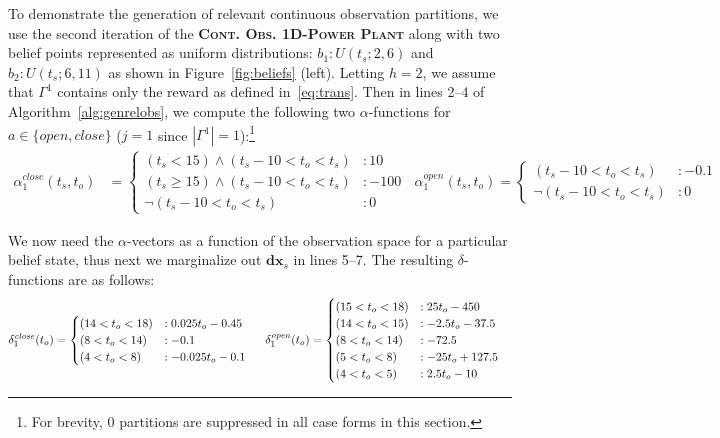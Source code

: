 \documentclass{article} %
\newcommand{\xds}{\mathbf{dx}_s}
\newcommand{\open}{\mathit{open}}
\newcommand{\close}{\mathit{close}}
\begin{document}
To demonstrate the generation of relevant continuous observation partitions, 
we use the second iteration of the \textsc{\bf Cont. Obs. 1D-Power
  Plant} along with two belief points represented as 
uniform distributions: $b_1: U(t_s;2,6)$ and $b_2: U(t_s;6,11)$ as
shown in Figure~\ref{fig:beliefs} (left).
Letting $h=2$, we assume that $\Gamma^{1}$ contains only the 
reward as defined in~\eqref{eq:trans}.
Then in lines 2--4 of Algorithm~\ref{alg:genrelobs}, we compute the 
following two $\alpha$-functions for $a \in \{ \open, \close \}$ 
($j=1$ since $|\Gamma^{1}| = 1$):\footnote{For brevity, 0 partitions
are suppressed in all case forms in this section.}
{\footnotesize
\vspace{-1mm}
\begin{align}
\alpha_1^{\close}(t_s,t_o) &= 
\begin{cases}
 (t_s<15)\wedge (t_s \! - \! 10 < t_o<t_s) &\!\!\!: 10 \\
(t_s\geq15)\wedge (t_s \! - \! 10 < t_o<t_s) &\!\!\!: -100  \\
\neg(t_s \! - \! 10 < t_o<t_s) &\!\!\! : 0
\end{cases}
\;\;
\alpha_1^{\open}(t_s,t_o) = \begin{cases}
(t_s \! - \! 10 < t_o<t_s) &\!\!\!: -0.1 \\
\neg(t_s \! - \! 10 < t_o<t_s) &\!\!\!: 0
\end{cases}
\nonumber
\end{align}
\vspace{-4mm}
} 

We now need the $\alpha$-vectors as a function of the observation
space for a particular belief state, thus next we marginalize out $\xds$
in lines 5--7. The resulting $\delta$-functions are as follows:
{\footnotesize
\vspace{-1mm}
\begin{align}
\delta^{\close}_1(t_o) &= 
\begin{cases}
 (14 < t_o< 18) &: 0.025 t_o - 0.45\\
 (8 < t_o< 14) &:  - 0.1\\
 (4 < t_o< 8) &: - 0.025 t_o -0.1\\
\end{cases}
\hspace{5mm} 
\delta^{\open}_1(t_o) = \begin{cases}
 (15 < t_o< 18) &: 25 t_o - 450\\
 (14 < t_o< 15) &: - 2.5 t_o - 37.5\\
 (8 < t_o< 14) &:  -72.5\\
 (5 < t_o< 8) &: - 25 t_o + 127.5\\
 (4 < t_o< 5) &:  2.5 t_o - 10\\
\end{cases}
\nonumber
\end{align}
\vspace{-4mm}
}
\end{document}
